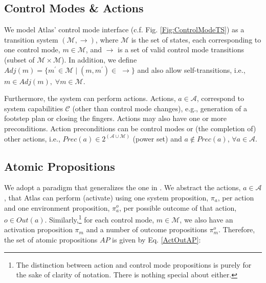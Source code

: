 
\subsection{Control Modes \& Actions}\label{S:CMActions}

We model Atlas' control mode interface (c.f. Fig. \ref{Fig:ControlModeTS}) as a transition system $(\mathcal{M}, \boldsymbol\rightarrow)$, where $\mathcal{M}$ is the set of states, each corresponding to one control mode, $m \in \mathcal{M}$, and $\boldsymbol\rightarrow$ is a set of valid control mode transitions (subset of $\mathcal{M} \times \mathcal{M}$).
In addition, we define $Adj(m) = \{ m^\prime \in \mathcal{M} \; | \; (m, m^\prime) \in \; \boldsymbol\rightarrow \}$ and also allow self-transitions, i.e., $m \in Adj(m), \; \forall m \in \mathcal{M}$.

Furthermore, the system can perform actions. Actions, $a \in \mathcal{A}$, correspond to system capabilities $\mathcal{C}$ (other than control mode changes), e.g., generation of a footstep plan or closing the fingers.
Actions may also have one or more preconditions.
Action preconditions can be control modes or (the completion of) other actions, i.e., $Prec(a) \in 2^{(\mathcal{A} \cup \mathcal{M})}$ (power set) and $a \not \in Prec(a)$, $\forall a \in \mathcal{A}$.

\subsection{Atomic Propositions}

We adopt a paradigm that generalizes the one in \cite{Vasu2013ICRA}.
We abstract the actions, $a \in \mathcal{A}$, that Atlas can perform (activate) using one system proposition, $\pi_a$, per action and one environment proposition, $\pi_a^o$, per possible outcome of that action, $o \in Out(a)$.
Similarly,\footnote{The distinction between action and control mode propositions is purely for the sake of clarity of notation. There is nothing special about either.}
for each control mode, $m \in \mathcal{M}$, we also have an activation proposition $\pi_m$ and a number of outcome propositions $\pi_m^o$.
Therefore, the set of atomic propositions $AP$ is given by Eq. \eqref{ActOutAP}:

